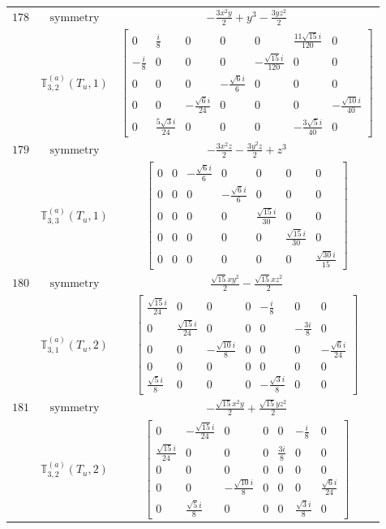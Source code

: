 \documentclass[fleqn,8pt,landscape]{jsarticle}
\begin{document}
\begin{longtable}{ccc}
$ 178 $ & $ \text{symmetry} $ & $ - \frac{3 x^{2} y}{2} + y^{3} - \frac{3 y z^{2}}{2} $ \\
$  $ & $ \mathbb{T}_{3,2}^{(a)}(T_{u},1) $ & $ \begin{bmatrix} 0 & \frac{i}{8} & 0 & 0 & 0 & \frac{11 \sqrt{15} i}{120} & 0 \\ - \frac{i}{8} & 0 & 0 & 0 & - \frac{\sqrt{15} i}{120} & 0 & 0 \\ 0 & 0 & 0 & - \frac{\sqrt{6} i}{6} & 0 & 0 & 0 \\ 0 & 0 & - \frac{\sqrt{6} i}{24} & 0 & 0 & 0 & - \frac{\sqrt{10} i}{40} \\ 0 & \frac{5 \sqrt{3} i}{24} & 0 & 0 & 0 & - \frac{3 \sqrt{5} i}{40} & 0 \end{bmatrix} $ \\ \hline
$ 179 $ & $ \text{symmetry} $ & $ - \frac{3 x^{2} z}{2} - \frac{3 y^{2} z}{2} + z^{3} $ \\
$  $ & $ \mathbb{T}_{3,3}^{(a)}(T_{u},1) $ & $ \begin{bmatrix} 0 & 0 & - \frac{\sqrt{6} i}{6} & 0 & 0 & 0 & 0 \\ 0 & 0 & 0 & - \frac{\sqrt{6} i}{6} & 0 & 0 & 0 \\ 0 & 0 & 0 & 0 & \frac{\sqrt{15} i}{30} & 0 & 0 \\ 0 & 0 & 0 & 0 & 0 & \frac{\sqrt{15} i}{30} & 0 \\ 0 & 0 & 0 & 0 & 0 & 0 & \frac{\sqrt{30} i}{15} \end{bmatrix} $ \\ \hline
$ 180 $ & $ \text{symmetry} $ & $ \frac{\sqrt{15} x y^{2}}{2} - \frac{\sqrt{15} x z^{2}}{2} $ \\
$  $ & $ \mathbb{T}_{3,1}^{(a)}(T_{u},2) $ & $ \begin{bmatrix} \frac{\sqrt{15} i}{24} & 0 & 0 & 0 & - \frac{i}{8} & 0 & 0 \\ 0 & \frac{\sqrt{15} i}{24} & 0 & 0 & 0 & - \frac{3 i}{8} & 0 \\ 0 & 0 & - \frac{\sqrt{10} i}{8} & 0 & 0 & 0 & - \frac{\sqrt{6} i}{24} \\ 0 & 0 & 0 & 0 & 0 & 0 & 0 \\ \frac{\sqrt{5} i}{8} & 0 & 0 & 0 & - \frac{\sqrt{3} i}{8} & 0 & 0 \end{bmatrix} $ \\ \hline
$ 181 $ & $ \text{symmetry} $ & $ - \frac{\sqrt{15} x^{2} y}{2} + \frac{\sqrt{15} y z^{2}}{2} $ \\
$  $ & $ \mathbb{T}_{3,2}^{(a)}(T_{u},2) $ & $ \begin{bmatrix} 0 & - \frac{\sqrt{15} i}{24} & 0 & 0 & 0 & - \frac{i}{8} & 0 \\ \frac{\sqrt{15} i}{24} & 0 & 0 & 0 & \frac{3 i}{8} & 0 & 0 \\ 0 & 0 & 0 & 0 & 0 & 0 & 0 \\ 0 & 0 & - \frac{\sqrt{10} i}{8} & 0 & 0 & 0 & \frac{\sqrt{6} i}{24} \\ 0 & \frac{\sqrt{5} i}{8} & 0 & 0 & 0 & \frac{\sqrt{3} i}{8} & 0 \end{bmatrix} $ \\ \hline

\end{longtable}
\end{document}

